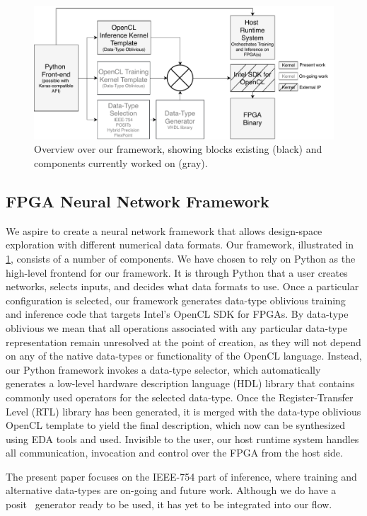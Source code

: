 \documentclass[techrep,english]{ipsj} %
\begin{document}
\begin{figure}[p]
  \centering
  \includegraphics[width=0.7\linewidth]{training_overview.pdf}
  \caption{Overview over our framework, showing blocks existing (black) and components currently worked on (gray).}\label{fig:overview}
\end{figure}

\subsection{FPGA Neural Network Framework}
We aspire to create a neural network framework that allows design-space exploration with different numerical data formats.
Our framework, illustrated in \cref{fig:overview}, consists of a number of components.
We have chosen to rely on Python as the high-level frontend for our framework.
It is through Python that a user creates networks, selects inputs, and decides what data formats to use.
Once a particular configuration is selected, our framework generates data-type oblivious training and inference code that targets Intel's OpenCL SDK for FPGAs.
By data-type oblivious we mean that all operations associated with any particular data-type representation remain unresolved at the point of creation, as they will not depend on any of the native data-types or functionality of the OpenCL language.
Instead, our Python framework invokes a data-type selector, which automatically generates a low-level hardware description language (HDL) library that contains commonly used operators for the selected data-type.
Once the Register-Transfer Level (RTL) library has been generated, it is merged with the data-type oblivious OpenCL template to yield the final description, which now can be synthesized using EDA tools and used.
Invisible to the user, our host runtime system handles all communication, invocation and control over the FPGA from the host side.

The present paper focuses on the IEEE-754 part of inference, where training and alternative data-types are on-going and future work.
Although we do have a posit~\cite{podobasposit} generator ready to be used, it has yet to be integrated into our flow.
\end{document}

